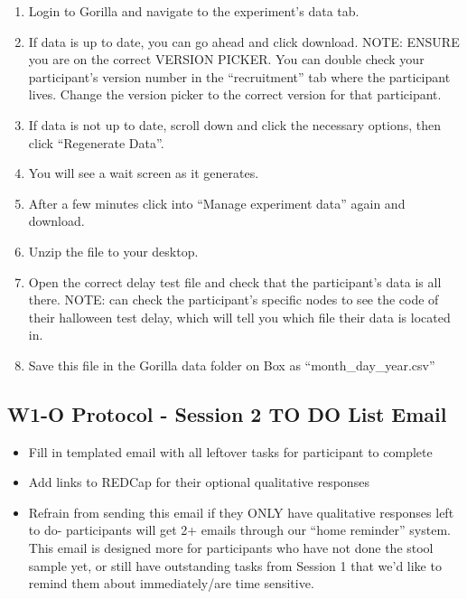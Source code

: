 \documentclass[
]{book}
\providecommand{\tightlist}{%
  \setlength{\itemsep}{0pt}\setlength{\parskip}{0pt}}
\begin{document}
\begin{enumerate}
\def\labelenumi{\arabic{enumi}.}
\item
  Login to Gorilla and navigate to the experiment's data tab.
\item
  If data is up to date, you can go ahead and click download. NOTE: ENSURE you are on the correct VERSION PICKER. You can double check your participant's version number in the ``recruitment'' tab where the participant lives. Change the version picker to the correct version for that participant.
\item
  If data is not up to date, scroll down and click the necessary options, then click ``Regenerate Data''.
\item
  You will see a wait screen as it generates.
\item
  After a few minutes click into ``Manage experiment data'' again and download.
\item
  Unzip the file to your desktop.
\item
  Open the correct delay test file and check that the participant's data is all there. NOTE: can check the participant's specific nodes to see the code of their halloween test delay, which will tell you which file their data is located in.
\item
  Save this file in the Gorilla data folder on Box as ``month\_day\_year.csv''
\end{enumerate}

\hypertarget{w1-o-protocol---session-2-to-do-list-email}{%
\subsection{W1-O Protocol - Session 2 TO DO List Email}\label{w1-o-protocol---session-2-to-do-list-email}}

\begin{itemize}
\tightlist
\item
  Fill in templated email with all leftover tasks for participant to complete
\item
  Add links to REDCap for their optional qualitative responses
\item
  Refrain from sending this email if they ONLY have qualitative responses left to do- participants will get 2+ emails through our ``home reminder'' system. This email is designed more for participants who have not done the stool sample yet, or still have outstanding tasks from Session 1 that we'd like to remind them about immediately/are time sensitive.
\end{itemize}
\end{document}
